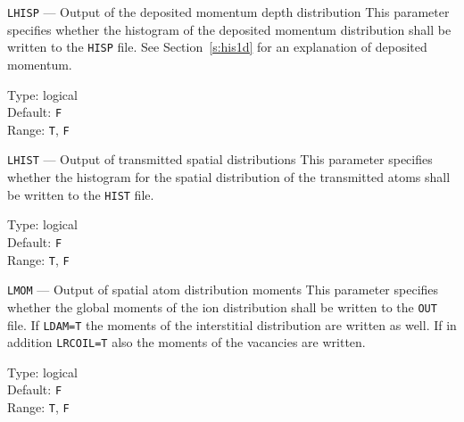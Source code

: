 \begin{keydescription}{\texttt{LHISP} --- Output of the deposited momentum depth distribution}
%
  This parameter specifies whether the histogram of the deposited momentum distribution shall 
  be written to the \texttt{HISP} file. See Section~\ref{s:his1d} for an explanation of 
  deposited momentum. 
  \begin{keytab}
    Type:    \> logical \\
    Default: \> \texttt{F} \\
    Range:   \> \texttt{T}, \texttt{F} 
  \end{keytab}
\end{keydescription}

\begin{keydescription}{\texttt{LHIST} --- Output of transmitted spatial distributions}
%
  This parameter specifies whether the histogram for the spatial distribution of the 
  transmitted atoms shall be written to the \texttt{HIST} file.
  \begin{keytab}
    Type:    \> logical \\
    Default: \> \texttt{F} \\
    Range:   \> \texttt{T}, \texttt{F} 
  \end{keytab}
\end{keydescription}

\iffalse
\begin{keydescription}{\texttt{LLINCOLL} --- Linear collision sequence flag}
%
  This parameter specifies whether linear collision sequences shall be
  analyzed. Currently, only linear collision sequences leading to sputtering
  are analyzed. If a linear collision sequence is identified, \texttt{N, DIRLIN(:)} 
  is appended to the respective line in the \texttt{TRA} file. Here,
  \texttt{N} denotes the length of the linear collision sequence, and
  \texttt{DIRLEN} its direction vector in the crystal coordinate
  system. Linear collision sequences are only identified in crystalline regions
  and are reported only in the \texttt{TRA} file.
  \begin{keytab}
    Type:    \> logical \\
    Default: \> \texttt{F} \\
    Range:   \> \texttt{T}, \texttt{F} 
  \end{keytab}
\end{keydescription}
\fi

\begin{keydescription}{\texttt{LMOM} --- Output of spatial atom distribution moments}
%
  This parameter specifies whether the global moments of the ion distribution shall be written 
  to the \texttt{OUT} file. If \texttt{LDAM=T} the moments of the interstitial distribution are
  written as well. If in addition \texttt{LRCOIL=T} also the moments of the vacancies are 
  written.
  \begin{keytab}
    Type:    \> logical \\
    Default: \> \texttt{F} \\
    Range:   \> \texttt{T}, \texttt{F} 
  \end{keytab}
\end{keydescription}

